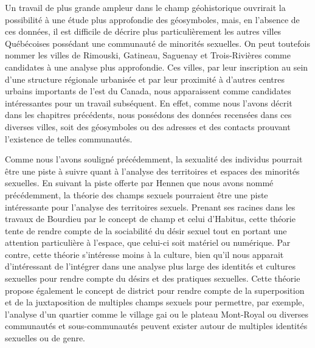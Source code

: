 Un travail de plus grande ampleur dans le champ géohistorique ouvrirait la possibilité à une étude plus approfondie des géosymboles, mais, en l'absence de ces données, il est difficile de décrire plus particulièrement les autres villes Québécoises possédant une communauté de minorités sexuelles.
On peut toutefois nommer les villes de Rimouski, Gatineau, Saguenay et Trois-Rivières comme candidates à une analyse plus approfondie.
Ces villes, par leur inscription au sein d'une structure régionale urbanisée et par leur proximité à d'autres centres urbains importants de l'est du Canada, nous apparaissent comme candidates intéressantes pour un travail subséquent.
En effet, comme nous l'avons décrit dans les chapitres précédents, nous possédons des données recensées dans ces diverses villes, soit des géosymboles ou des adresses et des contacts prouvant l'existence de telles communautés.

Comme nous l'avons souligné précédemment, la sexualité des individus pourrait être une piste à suivre quant à l'analyse des territoires et espaces des minorités sexuelles.
En suivant la piste offerte par Hennen que nous avons nommé précédemment, la théorie des champs sexuels pourraient être une piste intéressante pour l'analyse des territoires sexuels.
Prenant ses racines dans les travaux de Bourdieu par le concept de champ et celui d'Habitus, cette théorie tente de rendre compte de la sociabilité du désir sexuel tout en portant une attention particulière à l'espace, que celui-ci soit matériel ou numérique.
Par contre, cette théorie s'intéresse moins à la culture, bien qu'il nous apparait d'intéressant de l'intégrer dans une analyse plus large des identités et cultures sexuelles pour rendre compte du désirs et des pratiques sexuelles.
Cette théorie propose également le concept de district pour rendre compte de la superposition et de la juxtaposition de multiples champs sexuels pour permettre, par exemple, l'analyse d'un quartier comme le village gai ou le plateau Mont-Royal ou diverses communautés et sous-communautés peuvent exister autour de multiples identités sexuelles ou de genre.



